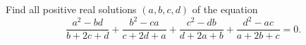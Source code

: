 Find all positive real solutions $(a,b,c,d)$ of the equation
$$\frac{a^2-bd}{b+2c+d}+\frac{b^2-ca}{c+2d+a}+\frac{c^2-db}{d+2a+b}+\frac{d^2-ac}{a+2b+c} = 0.$$
